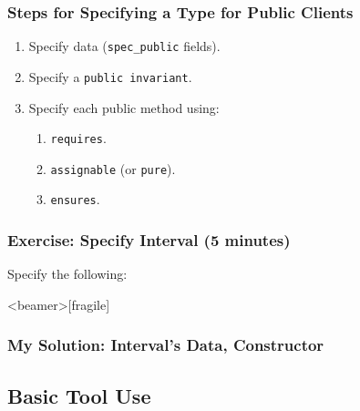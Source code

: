 \begin{frame}[fragile]
\frametitle{Steps for Specifying a Type for Public Clients}

\begin{enumerate}
\item
Specify data (\lstinline!spec_public! fields).

\item
Specify a \lstinline!public invariant!.

\item
Specify each public method using:

\begin{enumerate}
\item
\lstinline!requires!.

\item
\lstinline!assignable! (or \lstinline!pure!).

\item
\lstinline!ensures!.
\end{enumerate}
\end{enumerate}
\end{frame}

\begin{frame}[fragile]
\frametitle{Exercise: Specify Interval (5 minutes)}

\begin{exercise}
Specify the following:

\rm

\end{exercise}
\end{frame}

\begin{frame}<beamer>[fragile]
\frametitle{My Solution: Interval's Data, Constructor}


\end{frame}

\subsection[Tools]{Basic Tool Use}  %

